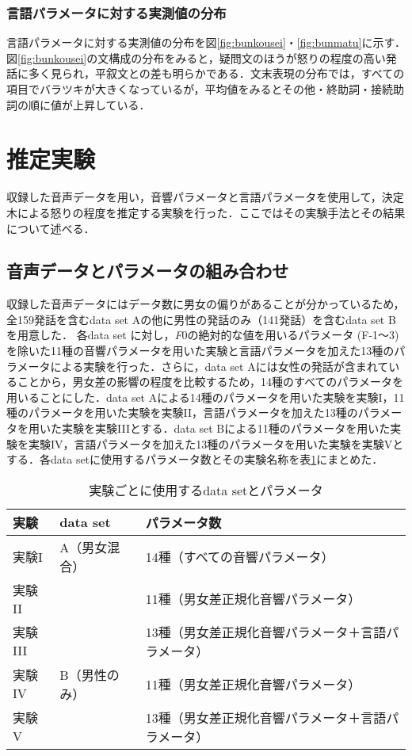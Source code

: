 \documentclass[japanese]{jnlp_1.3c}
\begin{document}
\subsubsection{言語パラメータに対する実測値の分布}
言語パラメータに対する実測値の分布を図\ref{fig:bunkousei}・\ref{fig:bunmatu}に示す．図\ref{fig:bunkousei}の文構成の分布をみると，疑問文のほうが怒りの程度の高い発話に多く見られ，平叙文との差も明らかである．文末表現の分布では，すべての項目でバラツキが大きくなっているが，平均値をみるとその他・終助詞・接続助詞の順に値が上昇している．


\section{推定実験}
収録した音声データを用い，音響パラメータと言語パラメータを使用して，決定木による怒りの程度を推定する実験を行った．ここではその実験手法とその結果について述べる．

\subsection{音声データとパラメータの組み合わせ}
収録した音声データにはデータ数に男女の偏りがあることが分かっている\cite[など]{Arimoto2004,Arimoto2005a,Arimoto2005b}ため，全159発話を含むdata set Aの他に男性の発話のみ（141発話）を含むdata set Bを用意した．
各data set に対し，{\it F}{\tiny 0}の絶対的な値を用いるパラメータ (F-1〜3) を除いた11種の音響パラメータを用いた実験と言語パラメータを加えた13種のパラメータによる実験を行った．さらに，data set Aには女性の発話が含まれていることから，男女差の影響の程度を比較するため，14種のすべてのパラメータを用いることにした．data set Aによる14種のパラメータを用いた実験を実験I，11種のパラメータを用いた実験を実験II，言語パラメータを加えた13種のパラメータを用いた実験を実験IIIとする．data set Bによる11種のパラメータを用いた実験を実験IV，言語パラメータを加えた13種のパラメータを用いた実験を実験Vとする．各data setに使用するパラメータ数とその実験名称を表\ref{tb:experiment}にまとめた．

\begin{table}[b] 
\caption{実験ごとに使用するdata setとパラメータ}
\label{tb:experiment}
\begin{center}
\begin{tabular}{lll}
\hline
実験&data set&パラメータ数 \\ \hline 
実験I&A（男女混合）&14種（すべての音響パラメータ）\\
実験II&&11種（男女差正規化音響パラメータ）\\
実験III&&13種（男女差正規化音響パラメータ＋言語パラメータ）\\ 
実験IV&B（男性のみ）&11種（男女差正規化音響パラメータ）\\
実験V&&13種（男女差正規化音響パラメータ＋言語パラメータ）\\ \hline 
\end{tabular}
\end{center}
\end{table}
\end{document}
